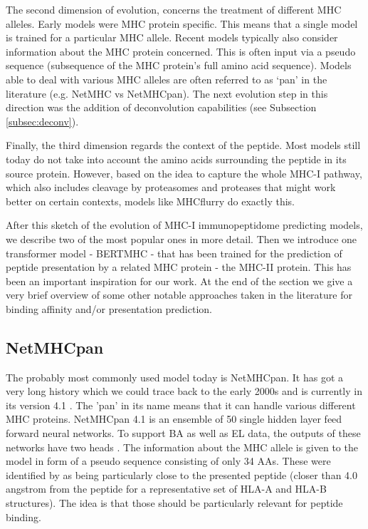\documentclass[msc,deptreport,ai]{infthesis} %
\begin{document}
The second dimension of evolution, concerns the treatment of different MHC alleles. Early models were \gls{MHC} protein specific. This means that a single model is trained for a particular \gls{MHC} allele. Recent models typically also consider information about the \gls{MHC} protein concerned. This is often input via a pseudo sequence (subsequence of the \gls{MHC} protein's full amino acid sequence). Models able to deal with various \gls{MHC} alleles are often referred to as `pan' in the literature (e.g. NetMHC vs NetMHCpan). The next evolution step in this direction was the addition of deconvolution capabilities (see Subsection \ref{subsec:deconv}). 

Finally, the third dimension regards the context of the peptide. Most models still today do not take into account the amino acids surrounding the peptide in its source protein. However, based on the idea to capture the whole \gls{MHC-I} pathway, which also includes cleavage by proteasomes and proteases that might work better on certain contexts, models like MHCflurry \cite{odonnell_mhcflurry_2020} do exactly this. 

After this sketch of the evolution of \gls{MHC-I} immunopeptidome predicting models, we describe two of the most popular ones in more detail. Then we introduce one transformer model - BERTMHC - that has been trained for the prediction of peptide presentation by a related \gls{MHC} protein - the \gls{MHC-II} protein. This has been an important inspiration for our work. At the end of the section we give a very brief overview of some other notable approaches taken in the literature for binding affinity and/or presentation prediction.

	\subsection{NetMHCpan}
	\label{subsec:netmhcpan}
	
	The probably most commonly used model today is NetMHCpan. It has got a very long history which we could trace back to the early 2000s \cite{nielsen_reliable_2003} and is currently in its version 4.1 \cite{reynisson_netmhcpan-41_2020}. The 'pan' in its name means that it can handle various different \gls{MHC} proteins. NetMHCpan 4.1 is an ensemble of 50 single hidden layer feed forward neural networks. To support \gls{BA} as well as \gls{EL} data, the outputs of these networks have two heads \cite[supplement]{reynisson_netmhcpan-41_2020}. The information about the \gls{MHC} allele is given to the model in form of a pseudo sequence consisting of only 34 \glspl{AA}. These were identified by \cite{nielsen_netmhcpan_2007} as being particularly close to the presented peptide (closer than 4.0 angstrom from the peptide for a representative set of HLA-A and HLA-B structures). The idea is that those should be particularly relevant for peptide binding.
\end{document}
